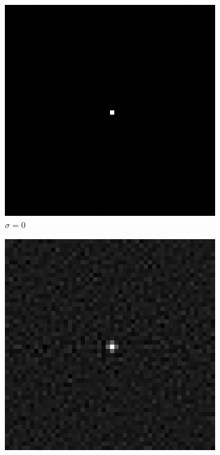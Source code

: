 \begin{figure}[htpb]
\begin{subfigure}{.25\textwidth}
\end{subfigure}
\quad
\begin{subfigure}{.25\textwidth}
\includegraphics[width=1\textwidth]{img/noiselessPOCsigma0}
\caption{$\sigma = 0$}
\end{subfigure}%
\begin{subfigure}{.25\textwidth}
\includegraphics[width=1\textwidth]{img/noiselessPOCsigma75}

\end{subfigure}
\end{figure}
